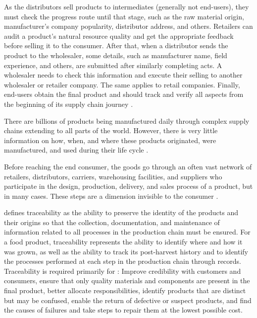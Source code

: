 As the distributors sell products to intermediates (generally not end-users), they must check the progress route until that stage, such as the raw material origin, manufacturer's company popularity, distributor address, and others. Retailers can audit a product's natural resource quality and get the appropriate feedback before selling it to the consumer.   After that,  when a distributor sends the product to the wholesaler, some details, such as manufacturer name, field experience, and others, are submitted after similarly completing acts. A wholesaler needs to check this information and execute their selling to another wholesaler or retailer company. The same applies to retail companies. Finally, end-users obtain the final product and should track and verify all aspects from the beginning of its supply chain journey \cite{litke2019blockchains}. 

There are billions of products being manufactured daily through complex supply chains extending to all parts of the world. However, there is very little information on how, when, and where these products originated, were manufactured, and used during their life cycle \cite{horiuchirastreabilidade}.

Before reaching the end consumer, the goods go through an often vast network of retailers, distributors, carriers, warehousing facilities, and suppliers who participate in the design, production, delivery, and sales process of a product, but in many cases. These steps are a dimension invisible to the consumer \cite{provenance2015}.

 defines traceability as the ability to preserve the identity of the products and their origins so that the collection, documentation, and maintenance of information related to all processes in the production chain must be ensured. For a food product, traceability represents the ability to identify where and how it was grown, as well as the ability to track its post-harvest history and to identify the processes performed at each step in the production chain through records. Traceability is required primarily for \cite{horiuchirastreabilidade}: Improve credibility with customers and consumers, ensure that only quality materials and components are present in the final product, better allocate responsibilities, identify products that are distinct but may be confused, enable the return of defective or suspect products, and find the causes of failures and take steps to repair them at the lowest possible cost.

